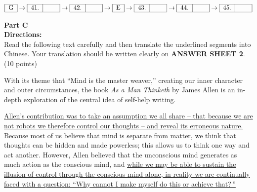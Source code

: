 \[ 
\begin{tabular}{|c|}
	\hline
	G \\
	\hline
\end{tabular}
\rightarrow
\begin{tabular}{|c|c|}
	\hline
	41. &  \hspace{1.5em} \\
	\hline
\end{tabular}
\rightarrow
\begin{tabular}{|c|c|}
	\hline
	42. &  \hspace{1.5em} \\
	\hline
\end{tabular}
\rightarrow
\begin{tabular}{|c|}
	\hline
	E \\
	\hline
\end{tabular}
\rightarrow
\begin{tabular}{|c|c|}
	\hline
	43. &  \hspace{1.5em} \\
	\hline
\end{tabular}
\rightarrow
\begin{tabular}{|c|c|}
	\hline
	44. &  \hspace{1.5em} \\
	\hline
\end{tabular}
\rightarrow
\begin{tabular}{|c|c|}
	\hline
	45. &  \hspace{1.5em} \\
	\hline
\end{tabular}
\]


\phantom{ \linefill \linefill \linefill \linefill \linefill}



\newpage
\noindent
\textbf{Part C}\\
\textbf{Directions:}\\
Read the following text carefully and then translate the
	underlined segments into Chinese. Your translation should be written
	clearly on \textbf{ANSWER SHEET 2}. (10 points)

\TiGanSpace


With its theme that ``Mind is the master weaver,'' creating our inner
character and outer circumstances, the book \emph{As a Man Thinketh} by
James Allen is an in-depth exploration of the central idea of self-help
writing.

\transnum \uline{Allen's contribution was to take an assumption we all
	share -- that because we are not robots we therefore control our
	thoughts -- and reveal its erroneous nature.} Because most of us believe
that mind is separate from matter, we think that thoughts can be hidden
and made powerless; this allows us to think one way and act another.
However, Allen believed that the unconscious mind generates as much
action as the conscious mind, and \transnum \uline{while we may be able to
	sustain the illusion of control through the conscious mind alone, in
	reality we are continually faced with a question: ``Why cannot I make
	myself do this or achieve that?\,''}

